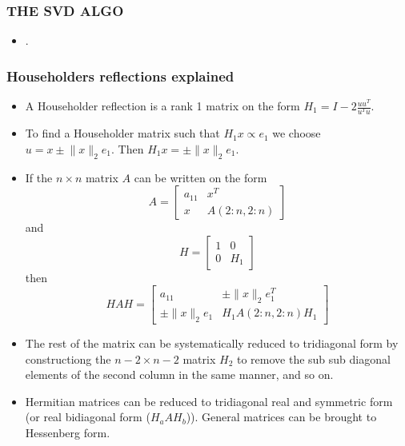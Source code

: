 \documentclass[a4paper,8pt]{beamer} %
\newcommand{\norm}[1]{\lVert{#1}\rVert}
\newcommand{\smatrix}[1]{\left[\begin{matrix} #1 \end{matrix}\right]}
\begin{document}
\begin{frame}%
	\frametitle{THE SVD ALGO}
	\begin{itemize}
		\item  . %
	\end{itemize}
\end{frame}%





\begin{frame}[label=householders explained] \frametitle{Householders reflections explained}%
		\begin{itemize}
			\item A Householder reflection is a rank 1 matrix on the form $H_1 = I - 2\frac{uu^T}{u^Tu}$.
			\item To find a Householder matrix such that $H_1 x \propto e_1$ we choose $u = x \pm \norm{x}_2 e_1$.
				Then $H_1 x = \pm \norm{x}_2 e_1$.
			\item If the $n\times n$ matrix $A$ can be written on the form \[ A = \smatrix{a_{11} & x^T \\ x & A(2:n,2:n)} \] 
				and \[H = \smatrix{1 & 0 \\ 0 & H_1} \] then
				\[ HAH = \smatrix{a_{11} & \pm \norm{x}_2 e_1^T \\ \pm \norm{x}_2 e_1 &  H_1A(2:n,2:n)H_1 }\]
			\item The rest of the matrix can be systematically reduced to tridiagonal form by constructiong the $n-2\times n-2$ matrix $H_2$
				to remove the sub sub diagonal elements of the second column in the same manner, and so on.
			\item Hermitian matrices can be reduced to tridiagonal real and symmetric form (or real bidiagonal form ($H_aAH_b$)). General matrices can be brought to Hessenberg form.
		\end{itemize}
		\hyperlink{tridiagonalizationofa}{}
	\end{frame}%
\end{document}
